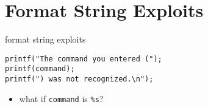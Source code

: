 \section{Format String Exploits}

\begin{frame}[fragile,label=formatStringIntro]{format string exploits}
\lstset{language=C}
\begin{lstlisting}
printf("The command you entered (");
printf(command);
printf(") was not recognized.\n");
\end{lstlisting}
    \begin{itemize}
        \item<2> what if \texttt{command} is {\tt \%s}?
    \end{itemize}
\end{frame}


